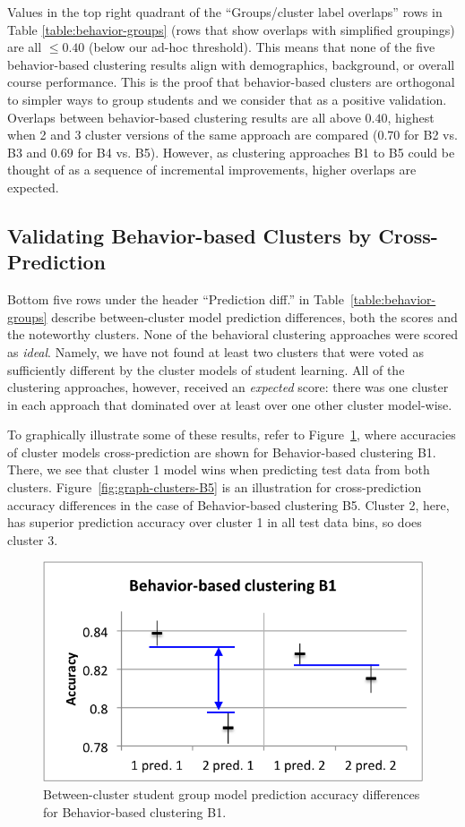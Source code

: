 \documentclass{sigchi}
\begin{document}
Values in the top right quadrant of the ``Groups/cluster label overlaps'' rows in Table \ref{table:behavior-groups} (rows that show overlaps with simplified groupings) are all $\leq 0.40$ (below our ad-hoc threshold). This means that none of the five behavior-based clustering results align with demographics, background, or overall course performance. This is the proof that behavior-based clusters are orthogonal to simpler ways to group students and we consider that as a positive validation. Overlaps between behavior-based clustering results are all above $0.40$, highest when 2 and 3 cluster versions of the same approach are compared ($0.70$ for B2 vs. B3 and $0.69$ for B4 vs. B5). However, as clustering approaches B1 to B5 could be thought of as a sequence of incremental improvements, higher overlaps are expected.

\subsection{Validating Behavior-based Clusters by Cross-Prediction}

Bottom five rows under the header ``Prediction diff.'' in Table~\ref{table:behavior-groups} describe between-cluster model prediction differences, both the scores and the noteworthy clusters. None of the behavioral clustering approaches were scored as \textit{ideal}. Namely, we have not found at least two clusters that were voted as sufficiently different by the cluster models of student learning. All of the clustering approaches, however, received an \textit{expected} score: there was one cluster in each approach that dominated over at least over one other cluster model-wise.

To graphically illustrate some of these results, refer to Figure~\ref{fig:graph-clusters-B1}, where accuracies of cluster models cross-prediction are shown for Behavior-based clustering B1. There, we see that cluster 1 model wins when predicting test data from both clusters. Figure~\ref{fig:graph-clusters-B5} is an illustration for cross-prediction accuracy differences in the case of Behavior-based clustering B5. Cluster 2, here, has superior prediction accuracy over cluster 1 in all test data bins, so does cluster 3.

\begin{figure}[thb]
\centering
   \includegraphics[width=0.7\columnwidth]{figures/behavior_clust_B1.png}
\caption{Between-cluster student group model prediction accuracy differences for Behavior-based clustering B1.}\vspace{-5pt}
\label{fig:graph-clusters-B1}
\end{figure}
\end{document}
